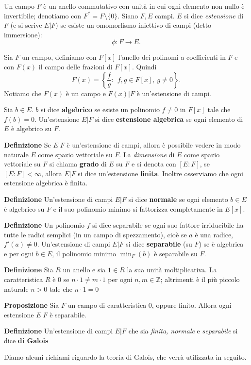 \documentclass[10pt,oneside]{article}
\theoremstyle{definition}
\theoremstyle{plain}
\theoremstyle{definition}
\theoremstyle{plain}
\theoremstyle{plain}
\newcommand{\Z}{\mathbb{Z}}
\begin{document}
Un campo $F$ è un anello commutativo con unità in cui ogni elemento non nullo è invertibile; denotiamo con $F^*=F \setminus \{0\}$.
Siano $F,E$ campi. $E$ si dice \textit{estensione} di $F$ (e si scrive $E | F$) se esiste  un omomorfismo iniettivo di campi (detto immersione):
\[ \phi : F \longrightarrow E .\]

Sia $F$ un campo, definiamo con $F[x]$ l'anello dei polinomi a coefficienti in $F$ e con $F(x)$ il campo delle frazioni di $F[x]$. Quindi
\[F(x)=\left\{ \frac{f}{g} : \  \  f,g \in F[x], \ g \neq 0\right\}.\]
Notiamo che $F(x)$ è un campo e $F(x)|F$ è un'estensione di campi.

Sia $b \in E$. $b$ si dice \textbf{algebrico} se esiste un polinomio $f \neq 0 $ in $F[x]$ tale che $f(b)=0$. Un'estensione $E|F$ si dice \textbf{estensione algebrica} se ogni elemento di $E$ è algebrico su $F$. 

\textbf{Definizione} Se $E|F$ è un'estensione di campi, allora è possibile vedere in modo naturale $E$ come spazio vettoriale su $F$. La \textit{dimensione} di $E$ come spazio vettoriale su $F$ si chiama \textbf{grado} di $E$ su $F$ e si denota con $[E:F]$, se $[E:F] < \infty$, allora $E|F$ si dice un'estensione \textbf{finita}. Inoltre osserviamo che ogni estensione algebrica è finita.


\textbf{Definizione} Un'estensione di campi $E|F$ si dice \textbf{normale} se ogni elemento $b \in E $ è algebrico  su $F$ e il suo polinomio minimo si fattorizza completamente in $E[x]$.

\textbf{Definizione} Un polinomio $f$ si dice separabile se ogni suo fattore irriducibile ha tutte le radici semplici (in un campo di spezzamento), cioè se $a$ è una radice, $f'(a)\neq 0$. Un'estensione di campi $E|F$ si dice \textbf{separabile} (su $F$) se è algebrica e per ogni $b \in E$, il polinomio minimo $\min_F(b)$ è separabile su $F$.

\textbf{Definizione} Sia $R$ un anello e sia $1 \in R$ la sua unità moltiplicativa. La caratteristica $R$ è 0 se $n\cdot 1 \neq m \cdot 1$ per ogni $n,m \in \Z$; altrimenti è il più piccolo naturale $n>0$ tale che $n \cdot 1 = 0 $

\textbf{Proposizione} Sia $F$ un campo di caratteristica 0, oppure finito. Allora ogni estensione $E|F$ è separabile.


\textbf{Definizione} Un'estensione di campi $E|F$ che sia \textit{finita, normale} e \textit{separabile} si dice \textbf{di Galois}

Diamo alcuni richiami riguardo la teoria di Galois, che verrà utilizzata in seguito.
\end{document}
